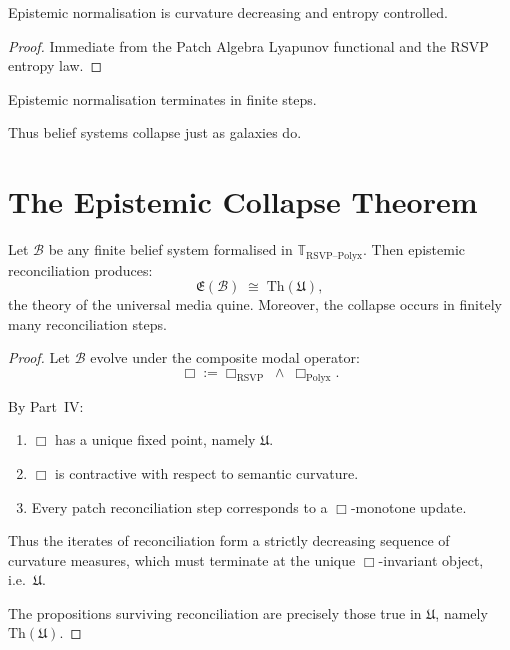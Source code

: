 \begin{lemma}
Epistemic normalisation is curvature decreasing and entropy controlled.
\end{lemma}

\begin{proof}
Immediate from the Patch Algebra Lyapunov functional and the RSVP entropy law.
\end{proof}

\begin{corollary}
Epistemic normalisation terminates in finite steps.
\end{corollary}

Thus belief systems collapse just as galaxies do.


\section{The Epistemic Collapse Theorem}

\begin{theorem}
\label{thm:epistemic-collapse}
Let $\mathcal{B}$ be any finite belief system formalised in $\mathbb{T}_{\mathrm{RSVP\text{--}Polyx}}$.
Then epistemic reconciliation produces:
\[
\mathfrak{E}(\mathcal{B}) \;\cong\; \mathrm{Th}(\mathfrak{U}),
\]
the theory of the universal media quine.  
Moreover, the collapse occurs in finitely many reconciliation steps.
\end{theorem}

\begin{proof}
Let $\mathcal{B}$ evolve under the composite modal operator:
\[
\Box := \Box_{\mathrm{RSVP}}\;\wedge\;\Box_{\mathrm{Polyx}}.
\]

By Part~IV:
\begin{enumerate}
\item $\Box$ has a unique fixed point, namely $\mathfrak{U}$.
\item $\Box$ is contractive with respect to semantic curvature.
\item Every patch reconciliation step corresponds to a $\Box$-monotone update.
\end{enumerate}

Thus the iterates of reconciliation form a strictly decreasing sequence of curvature measures,
which must terminate at the unique $\Box$-invariant object, i.e.\ $\mathfrak{U}$.

The propositions surviving reconciliation are precisely those true in $\mathfrak{U}$,
namely $\mathrm{Th}(\mathfrak{U})$.
\end{proof}

